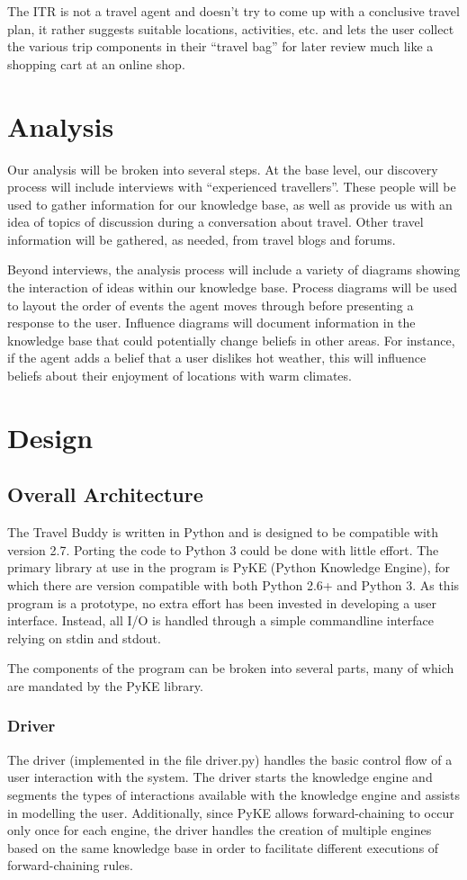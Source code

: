 \documentclass[11pt]{article} %
\begin{document}
The ITR is not a travel agent and doesn’t try to come up
with a conclusive travel plan, it rather suggests suitable
locations, activities, etc. and lets the user collect the
various trip components in their ``travel bag'' for later
review much like a shopping cart at an online shop. 

\section{Analysis}
Our analysis will be broken into several steps. At the
base level, our discovery process will include interviews
with ``experienced travellers''. These people will be used
to gather information for our knowledge base, as well as
provide us with an idea of topics of discussion during a
conversation about travel. Other travel information will
be gathered, as needed, from travel blogs and forums.

Beyond interviews, the analysis process will include a
variety of diagrams showing the interaction of ideas
within our knowledge base. Process diagrams will be used
to layout the order of events the agent moves through
before presenting a response to the user.
Influence diagrams will document information in the
knowledge base that could potentially change beliefs
in other areas. For instance, if the agent adds a belief
that a user dislikes hot weather, this will influence
beliefs about their enjoyment of locations with warm climates.

\section{Design}
\subsection{Overall Architecture}
The Travel Buddy is written in Python and is designed to be
compatible with version 2.7. Porting the code to
Python 3 could be done with little effort. The primary
library at use in the program is PyKE (Python Knowledge
Engine), for which there are version compatible with both
Python 2.6+ and Python 3. As this program is a prototype,
no extra effort has been invested in developing a
user interface. Instead, all I/O is handled through a simple
commandline interface relying on stdin and stdout.

The components of the program can be broken into several
parts, many of which are mandated by the PyKE library.

\subsubsection{Driver}
The driver (implemented in the file driver.py) handles the
basic control flow of a user interaction with the system.
The driver starts the knowledge engine and 
segments the types of interactions available
with the knowledge engine and assists in modelling the
user. Additionally, since PyKE allows forward-chaining to
occur only once for each engine, the driver handles the
creation of multiple engines based on the same knowledge
base in order to facilitate different executions of
forward-chaining rules.
\end{document}
